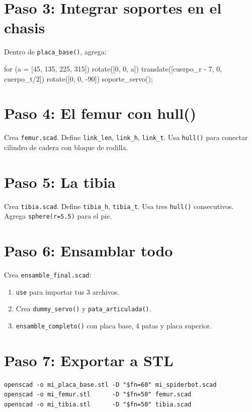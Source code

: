 \documentclass[12pt, oneside, a4paper]{report}
\newcommand{\codigo}[1]{\texttt{#1}}
\begin{document}
\section{Paso 3: Integrar soportes en el chasis}
Dentro de \codigo{placa\_base()}, agrega:
\begin{openscad}
for (a = [45, 135, 225, 315]) {
    rotate([0, 0, a])
        translate([cuerpo_r - 7, 0, cuerpo_t/2])
            rotate([0, 0, -90])
                soporte_servo();
}
\end{openscad}

\section{Paso 4: El femur con hull()}
Crea \codigo{femur.scad}. Define \codigo{link\_len}, \codigo{link\_h}, \codigo{link\_t}.
Usa \codigo{hull()} para conectar cilindro de cadera con bloque de rodilla.

\section{Paso 5: La tibia}
Crea \codigo{tibia.scad}. Define \codigo{tibia\_h}, \codigo{tibia\_t}.
Usa tres \codigo{hull()} consecutivos. Agrega \codigo{sphere(r=5.5)} para el pie.

\section{Paso 6: Ensamblar todo}
Crea \codigo{ensamble\_final.scad}:
\begin{enumerate}
    \item \codigo{use} para importar tus 3 archivos.
    \item Crea \codigo{dummy\_servo()} y \codigo{pata\_articulada()}.
    \item \codigo{ensamble\_completo()} con placa base, 4 patas y placa superior.
\end{enumerate}

\section{Paso 7: Exportar a STL}
{\small
\begin{verbatim}
openscad -o mi_placa_base.stl -D "$fn=60" mi_spiderbot.scad
openscad -o mi_femur.stl      -D "$fn=50" femur.scad
openscad -o mi_tibia.stl      -D "$fn=50" tibia.scad
\end{verbatim}
}

\end{document}
